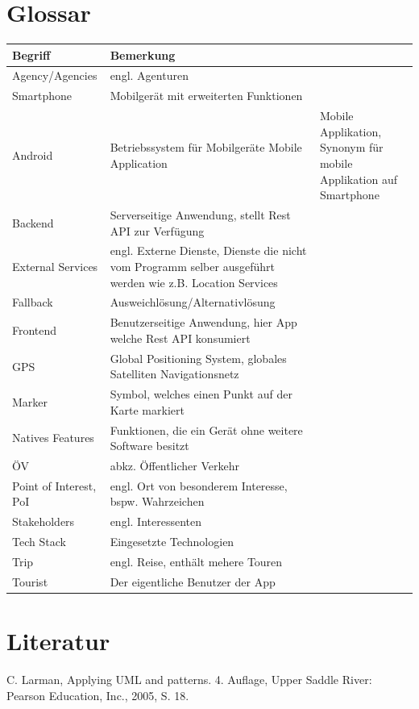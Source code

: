 \documentclass[a4paper,10pt,xetex]{article}
\begin{document}
\section{Glossar}\label{glossar}
\begin{longtabu} to \textwidth { | l | X[l] | }
\hline
\textbf{Begriff} & \textbf{Bemerkung}\\\hline
\endhead

Agency/Agencies & engl. Agenturen\\\hline
Smartphone & Mobilgerät mit erweiterten Funktionen\\\hline
Android & Betriebssystem für Mobilgeräte
Mobile Application & Mobile Applikation, Synonym für mobile Applikation auf Smartphone\\\hline
Backend & Serverseitige Anwendung, stellt Rest API zur Verfügung\\\hline
External Services & engl. Externe Dienste, Dienste die nicht vom Programm selber ausgeführt werden wie z.B. Location Services\\\hline
Fallback & Ausweichlösung/Alternativlösung\\\hline
Frontend & Benutzerseitige Anwendung, hier App welche Rest API konsumiert\\\hline
GPS & Global Positioning System, globales Satelliten Navigationsnetz\\\hline
Marker & Symbol, welches einen Punkt auf der Karte markiert\\\hline
Natives Features & Funktionen, die ein Gerät ohne weitere Software besitzt\\\hline
ÖV & abkz. Öffentlicher Verkehr\\\hline
Point of Interest, PoI & engl. Ort von besonderem Interesse, bspw. Wahrzeichen\\\hline
Stakeholders & engl. Interessenten\\\hline
Tech Stack & Eingesetzte Technologien\\\hline
Trip & engl. Reise, enthält mehere Touren\\\hline
Tourist & Der eigentliche Benutzer der App\\\hline
\end{longtabu}


\section{Literatur}\label{literatur}
\begingroup
\renewcommand{\section}[2]{}%
  \begin{thebibliography}{9}
     C. Larman, Applying UML and patterns. 4. Auflage, Upper Saddle River: Pearson Education, Inc., 2005, S. 18.
  \end{thebibliography}
\endgroup
\end{document}

